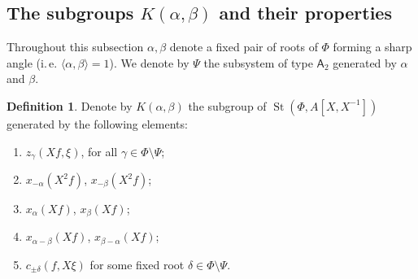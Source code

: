 \documentclass[oneside, 8pt]{amsart}
\theoremstyle{remark}
\theoremstyle{definition}
\newtheorem{df}[lemma]{Definition} \Crefname{df}{Definition}{Definitions}
\DeclareMathOperator{\St}{St}
\newcommand{\rA}{\mathsf{A}}
\numberwithin{equation}{section}
\begin{document}
\subsection{The subgroups $K(\alpha, \beta)$ and their properties}
Throughout this subsection $\alpha, \beta$ denote a fixed pair of roots of $\Phi$ forming a sharp angle (i.\,e. $\langle \alpha, \beta \rangle = 1$). We denote by $\Psi$ the subsystem of type $\rA_2$ generated by $\alpha$ and $\beta$.
\begin{df}
 Denote by $K(\alpha, \beta)$ the subgroup of $\St(\Phi, A[X, X^{-1}])$ generated by the following elements:
 \begin{enumerate}
  \item $z_\gamma(Xf, \xi)$, for all $\gamma \in \Phi \setminus \Psi$;
  \item $x_{-\alpha}(X^2f)$, $x_{-\beta}(X^2f)$;
  \item $x_{\alpha}(Xf)$, $x_\beta(Xf)$;
  \item $x_{\alpha-\beta}(Xf)$, $x_{\beta-\alpha}(Xf)$;
  \item $c_{\pm \delta}(f, X\xi)$ for some fixed root $\delta \in \Phi \setminus \Psi$.
 \end{enumerate}
\end{df}
\end{document}
